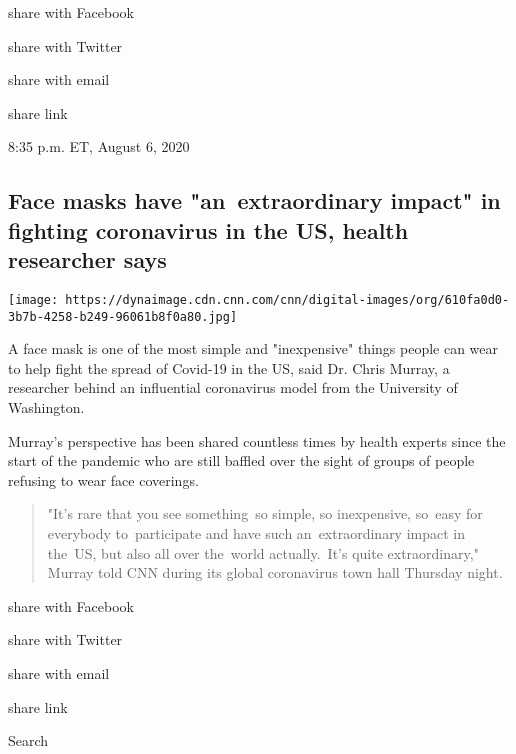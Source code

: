 share with Facebook

share with Twitter

share with email

share link

8:35 p.m. ET, August 6, 2020

\hypertarget{face-masks-have-an-extraordinary-impact-in-fighting-coronavirus-in-the-us-health-researcher-says}{%
\subsection{Face masks have "an~extraordinary impact" in fighting
coronavirus in the US, health researcher
says}\label{face-masks-have-an-extraordinary-impact-in-fighting-coronavirus-in-the-us-health-researcher-says}}

\texttt{[image: https://dynaimage.cdn.cnn.com/cnn/digital-images/org/610fa0d0-3b7b-4258-b249-96061b8f0a80.jpg]}

A face mask is one of the most simple and "inexpensive" things people
can wear to help fight the spread of Covid-19 in the US, said Dr. Chris
Murray, a researcher behind an influential coronavirus model from the
University of Washington.

Murray's perspective has been shared countless times by health experts
since the start of the pandemic who are still baffled over the sight of
groups of people refusing to wear face coverings.

\begin{quote}
"It's rare that you see something~so simple, so inexpensive, so~easy for
everybody to~participate and have such an~extraordinary impact in
the~US, but also all over the~world actually.~It's quite extraordinary,"
Murray told CNN during its global coronavirus town hall Thursday night.
\end{quote}

share with Facebook

share with Twitter

share with email

share link

Search

